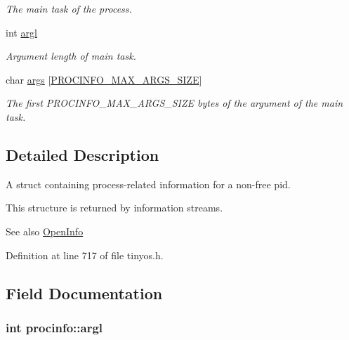 \begin{DoxyCompactItemize}
\begin{DoxyCompactList}\small\item\em The main task of the process. \end{DoxyCompactList}\item 
int \hyperlink{structprocinfo_ac63081c5a10bc230c115eea36c5f22fd}{argl}
\begin{DoxyCompactList}\small\item\em Argument length of main task. \end{DoxyCompactList}\item 
char \hyperlink{structprocinfo_ac812ea3215fafc8ced9f91320b2d3959}{args} \mbox{[}\hyperlink{group__syscalls_ga657ad9e9d81dcca25fb225cf99051e0d}{P\+R\+O\+C\+I\+N\+F\+O\+\_\+\+M\+A\+X\+\_\+\+A\+R\+G\+S\+\_\+\+S\+I\+ZE}\mbox{]}
\begin{DoxyCompactList}\small\item\em The first {\ttfamily P\+R\+O\+C\+I\+N\+F\+O\+\_\+\+M\+A\+X\+\_\+\+A\+R\+G\+S\+\_\+\+S\+I\+ZE} bytes of the argument of the main task. \end{DoxyCompactList}\end{DoxyCompactItemize}


\subsection{Detailed Description}
A struct containing process-\/related information for a non-\/free pid. 

This structure is returned by information streams. \begin{DoxySeeAlso}{See also}
\hyperlink{group__syscalls_gaf326b11574cdc84a9e21b9d860076821}{Open\+Info} 
\end{DoxySeeAlso}


Definition at line 717 of file tinyos.\+h.



\subsection{Field Documentation}
\subsubsection[{\texorpdfstring{argl}{argl}}]{\setlength{\rightskip}{0pt plus 5cm}int procinfo\+::argl}\hypertarget{structprocinfo_ac63081c5a10bc230c115eea36c5f22fd}{}\label{structprocinfo_ac63081c5a10bc230c115eea36c5f22fd}


